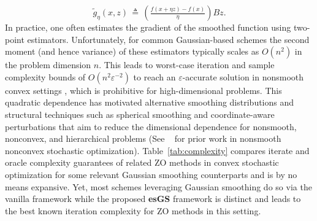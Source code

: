 \documentclass[11pt,reqno]{amsart}
\newcommand{\1}{{\bf 1}}
\newcommand{\2}{{\bf 2}}
\numberwithin{equation}{section}
\theoremstyle{remark}
\begin{document}
		\begin{equation}\label{eq:twopointgrad}
			\tilde{g}_\eta(x,z) \, \triangleq \, \left(\tfrac{f(x+\eta z)-f(x)}{\eta}\right) B z.
		\end{equation} 
		In practice, one often estimates the gradient of the smoothed function using two-point estimators. Unfortunately, for common Gaussian-based schemes the second moment (and hence variance) of these estimators typically scales as $O(n^2)$ in the problem dimension $n$. This leads to worst-case iteration and sample complexity bounds of $O(n^2 \varepsilon^{-2})$ to reach an $\varepsilon$-accurate solution in nonsmooth convex settings \cite{nesterov2017random}, which is prohibitive for high-dimensional problems. This quadratic dependence has motivated alternative smoothing distributions and structural techniques such as spherical smoothing and coordinate-aware perturbations that aim to reduce the dimensional dependence for nonsmooth, nonconvex, and hierarchical problems \cite{shanbhag2021zeroth,cui2023complexity,qiu2023zeroth,marrinan2026zeroth} (See ~\cite{marrinan2026zeroth} for prior work in nonsmooth nonconvex stochastic optimization). 
		Table~\ref{tab:complexity} compares iterate and oracle
		complexity guarantees of related ZO methods in convex stochastic
		optimization for {some relevant Gaussian smoothing counterparts and is by no means expansive. Yet, most schemes leveraging Gaussian smoothing do so via the vanilla framework while the proposed {\bf esGS} framework is distinct} and leads to the best known iteration complexity for ZO methods in this setting.
\end{document}
